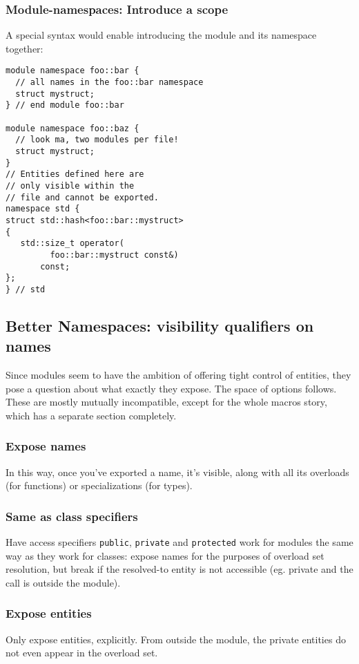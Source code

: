 \documentclass[reqno]{article}
\begin{document}
\subsubsection{Module-namespaces: Introduce a scope}

A special syntax would enable introducing the module and its namespace together:

\begin{verbatim}
module namespace foo::bar {
  // all names in the foo::bar namespace
  struct mystruct;
} // end module foo::bar

module namespace foo::baz {
  // look ma, two modules per file!
  struct mystruct;
}
// Entities defined here are
// only visible within the
// file and cannot be exported.
namespace std {
struct std::hash<foo::bar::mystruct>
{
   std::size_t operator(
         foo::bar::mystruct const&)
       const;
};
} // std
\end{verbatim}


\subsection{Better Namespaces: visibility qualifiers on names}

Since modules seem to have the ambition of offering tight control of entities,
they pose a question about what exactly they expose. The space of options
follows. These are mostly mutually incompatible, except for the whole macros
story, which has a separate section completely.

\subsubsection{Expose names}
In this way, once you've exported a name, it's visible, along with all its
overloads (for functions) or specializations (for types).

\subsubsection{Same as class specifiers}
Have access specifiers \texttt{public}, \texttt{private} and \texttt{protected}
work for modules the same way as they work for classes: expose names for the
purposes of overload set resolution, but break if the resolved-to entity is
not accessible (eg. private and the call is outside the module).

\subsubsection{Expose entities}
Only expose entities, explicitly. From outside the module, the private entities
do not even appear in the overload set.
\end{document}
